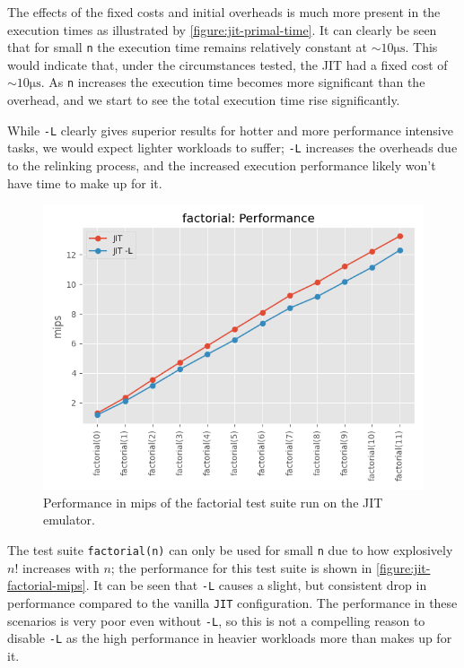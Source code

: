 The effects of the fixed costs and initial overheads is much more present in the execution times as illustrated by \autoref{figure:jit-primal-time}. It can clearly be seen that for small \texttt{n} the execution time remains relatively constant at $\sim10\si{\micro\second}$. This would indicate that, under the circumstances tested, the JIT had a fixed cost of $\sim10\si{\micro\second}$. As \texttt{n} increases the execution time becomes more significant than the overhead, and we start to see the total execution time rise significantly.

While \texttt{-L} clearly gives superior results for hotter and more performance intensive tasks, we would expect lighter workloads to suffer; \texttt{-L} increases the overheads due to the relinking process, and the increased execution performance likely won't have time to make up for it.

\begin{figure}[H]
    \centering
    \includegraphics[scale=0.75]{output/graphs/tests/jit/factorial/mips.png}
    \caption{Performance in mips of the factorial test suite run on the JIT emulator.}
    \label{figure:jit-factorial-mips}
\end{figure}

The test suite \texttt{factorial(n)} can only be used for small \texttt{n} due to how explosively $n!$ increases with $n$; the performance for this test suite is shown in \autoref{figure:jit-factorial-mips}. It can be seen that \texttt{-L} causes a slight, but consistent drop in performance compared to the vanilla \texttt{JIT} configuration. The performance in these scenarios is very poor even without \texttt{-L}, so this is not a compelling reason to disable \texttt{-L} as the high performance in heavier workloads more than makes up for it.

